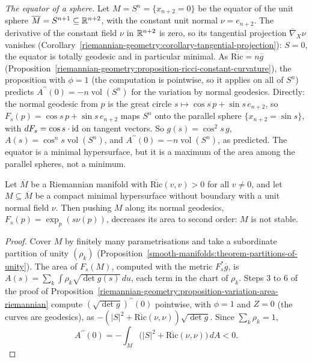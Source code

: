 \begin{example}\label{riemannian-geometry:example-equator-unstable}
\emph{The equator of a sphere.} Let $M = S^n = \{x_{n+2} = 0\}$ be the equator of the unit sphere $\overline{M} = S^{n+1} \subseteq \mathbb{R}^{n+2}$, with the constant unit normal
$\nu = e_{n+2}$. The derivative of the constant field $\nu$ in $\mathbb{R}^{n+2}$ is zero, so its tangential projection $\overline{\nabla}_X\nu$ vanishes
(Corollary~\ref{riemannian-geometry:corollary-tangential-projection}): $S = 0$, the equator is totally geodesic and in particular minimal. As
$\overline{\mathrm{Ric}} = n\overline{g}$ (Proposition~\ref{riemannian-geometry:proposition-ricci-constant-curvature}), the proposition with $\phi = 1$ (the computation is pointwise, so it applies on all of
$S^n$) predicts $A^{\prime\prime}(0) = -n\operatorname{vol}(S^n)$ for the variation by normal geodesics. Directly: the normal geodesic from $p$ is the great circle
$s \mapsto \cos s\,p + \sin s\,e_{n+2}$, so $F_s(p) = \cos s\,p + \sin s\,e_{n+2}$ maps $S^n$ onto the parallel sphere $\{x_{n+2} = \sin s\}$, with $dF_s = \cos s \cdot \mathrm{id}$ on tangent
vectors. So $g(s) = \cos^2s\,g$, $A(s) = \cos^ns\operatorname{vol}(S^n)$, and $A^{\prime\prime}(0) = -n\operatorname{vol}(S^n)$, as predicted. The equator is a minimal hypersurface, but it is a
maximum of the area among the parallel spheres, not a minimum.
\end{example}

\begin{corollary}\label{riemannian-geometry:corollary-ricci-unstable}
Let $\overline{M}$ be a Riemannian manifold with $\overline{\mathrm{Ric}}(v, v) > 0$ for all $v \neq 0$, and let $M \subseteq \overline{M}$ be a compact minimal hypersurface without boundary
with a unit normal field $\nu$. Then pushing $M$ along its normal geodesics, $F_s(p) = \exp_p(s\nu(p))$, decreases its area to second order: $M$ is not stable.
\end{corollary}

\begin{proof}
Cover $M$ by finitely many parametrisations and take a subordinate partition of unity $(\rho_k)$ (Proposition~\ref{smooth-manifolds:theorem-partitions-of-unity}). The area of
$F_s(M)$, computed with the metric $F_s^*\overline{g}$, is $A(s) = \sum_k\int\rho_k\sqrt{\det g(s)}\,du$, each term in the chart of $\rho_k$. Steps 3 to 6 of the proof of
Proposition~\ref{riemannian-geometry:proposition-variation-area-riemannian} compute $(\sqrt{\det g})^{\prime\prime}(0)$ pointwise, with $\phi = 1$ and $Z = 0$ (the curves are geodesics),
as $-(|S|^2 + \overline{\mathrm{Ric}}(\nu, \nu))\sqrt{\det g}$. Since $\sum_k\rho_k = 1$,
\[
A^{\prime\prime}(0) = -\int_M\bigl(|S|^2 + \overline{\mathrm{Ric}}(\nu, \nu)\bigr)\,dA < 0 .
\]
\end{proof}

